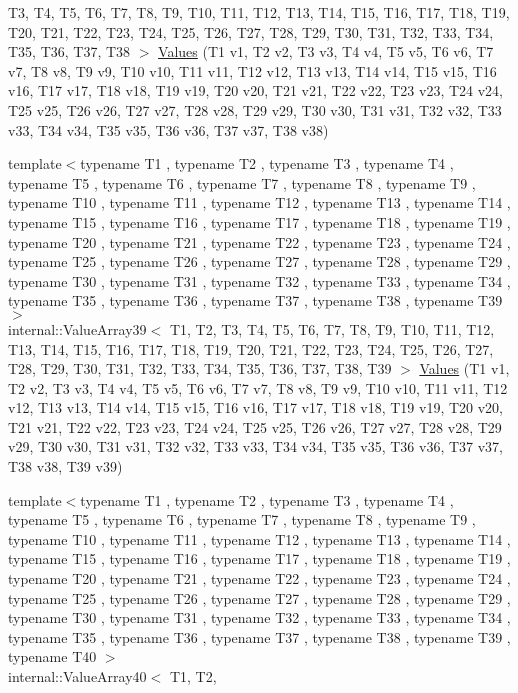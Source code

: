 \begin{DoxyCompactItemize}
\-T3, \-T4, \-T5, \-T6, \-T7, \-T8, \-T9, \*
\-T10, \-T11, \-T12, \-T13, \-T14, \-T15, \*
\-T16, \-T17, \-T18, \-T19, \-T20, \-T21, \*
\-T22, \-T23, \-T24, \-T25, \-T26, \-T27, \*
\-T28, \-T29, \-T30, \-T31, \-T32, \-T33, \*
\-T34, \-T35, \-T36, \-T37, \-T38 $>$ \hyperlink{namespacetesting_aabc33ee31d17eb0b0bed3401d62266d9}{\-Values} (\-T1 v1, \-T2 v2, \-T3 v3, \-T4 v4, \-T5 v5, \-T6 v6, \-T7 v7, \-T8 v8, \-T9 v9, \-T10 v10, \-T11 v11, \-T12 v12, \-T13 v13, \-T14 v14, \-T15 v15, \-T16 v16, \-T17 v17, \-T18 v18, \-T19 v19, \-T20 v20, \-T21 v21, \-T22 v22, \-T23 v23, \-T24 v24, \-T25 v25, \-T26 v26, \-T27 v27, \-T28 v28, \-T29 v29, \-T30 v30, \-T31 v31, \-T32 v32, \-T33 v33, \-T34 v34, \-T35 v35, \-T36 v36, \-T37 v37, \-T38 v38)
\item 
{\footnotesize template$<$typename T1 , typename T2 , typename T3 , typename T4 , typename T5 , typename T6 , typename T7 , typename T8 , typename T9 , typename T10 , typename T11 , typename T12 , typename T13 , typename T14 , typename T15 , typename T16 , typename T17 , typename T18 , typename T19 , typename T20 , typename T21 , typename T22 , typename T23 , typename T24 , typename T25 , typename T26 , typename T27 , typename T28 , typename T29 , typename T30 , typename T31 , typename T32 , typename T33 , typename T34 , typename T35 , typename T36 , typename T37 , typename T38 , typename T39 $>$ }\\internal\-::\-Value\-Array39$<$ \-T1, \-T2, \*
\-T3, \-T4, \-T5, \-T6, \-T7, \-T8, \-T9, \*
\-T10, \-T11, \-T12, \-T13, \-T14, \-T15, \*
\-T16, \-T17, \-T18, \-T19, \-T20, \-T21, \*
\-T22, \-T23, \-T24, \-T25, \-T26, \-T27, \*
\-T28, \-T29, \-T30, \-T31, \-T32, \-T33, \*
\-T34, \-T35, \-T36, \-T37, \-T38, \-T39 $>$ \hyperlink{namespacetesting_aba3a6a2dcb9660c6ccb1d867c7a137ee}{\-Values} (\-T1 v1, \-T2 v2, \-T3 v3, \-T4 v4, \-T5 v5, \-T6 v6, \-T7 v7, \-T8 v8, \-T9 v9, \-T10 v10, \-T11 v11, \-T12 v12, \-T13 v13, \-T14 v14, \-T15 v15, \-T16 v16, \-T17 v17, \-T18 v18, \-T19 v19, \-T20 v20, \-T21 v21, \-T22 v22, \-T23 v23, \-T24 v24, \-T25 v25, \-T26 v26, \-T27 v27, \-T28 v28, \-T29 v29, \-T30 v30, \-T31 v31, \-T32 v32, \-T33 v33, \-T34 v34, \-T35 v35, \-T36 v36, \-T37 v37, \-T38 v38, \-T39 v39)
\item 
{\footnotesize template$<$typename T1 , typename T2 , typename T3 , typename T4 , typename T5 , typename T6 , typename T7 , typename T8 , typename T9 , typename T10 , typename T11 , typename T12 , typename T13 , typename T14 , typename T15 , typename T16 , typename T17 , typename T18 , typename T19 , typename T20 , typename T21 , typename T22 , typename T23 , typename T24 , typename T25 , typename T26 , typename T27 , typename T28 , typename T29 , typename T30 , typename T31 , typename T32 , typename T33 , typename T34 , typename T35 , typename T36 , typename T37 , typename T38 , typename T39 , typename T40 $>$ }\\internal\-::\-Value\-Array40$<$ \-T1, \-T2, \*

\end{DoxyCompactItemize}
